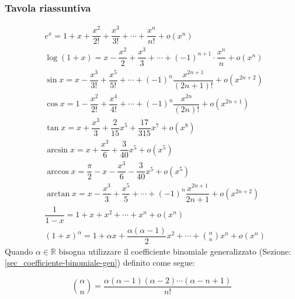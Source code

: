 
\clearpage %
\subsubsection{Tavola riassuntiva}
\begin{align*}
	&e^x = 1 + x + \dfrac{x^2}{2!} + \dfrac{x^3}{3!} + \cdots + \dfrac{x^n}{n!} + o(x^n)\\[10pt]
	&\log(1 + x) = x - \dfrac{x^2}{2} + \dfrac{x^3}{3} + \cdots + (-1)^{n+1} \cdot \dfrac{x^n}{n} + o(x^n)\\[10pt]
	&\sin{x} = x - \dfrac{x^3}{3!} + \dfrac{x^5}{5!} + \cdots + (-1)^n \dfrac{x^{2n+1}}{(2n+1)!} + o(x^{2n+2})\\[10pt]
	&\cos{x} = 1 - \dfrac{x^2}{2!} + \dfrac{x^4}{4!} + \cdots + (-1)^n \dfrac{x^{2n}}{(2n)!} + o(x^{2n+1})\\[10pt]
	&\tan{x} = x + \dfrac{x^3}{3} + \dfrac{2}{15}x^5 + \dfrac{17}{315}x^7 + o(x^8)\\[10pt]
	&\arcsin{x} = x + \dfrac{x^3}{6} + \dfrac{3}{40}x^5 + o(x^5)\\[10pt]
	&\arccos{x} = \dfrac{\pi}{2} - x - \dfrac{x^3}{6} - \dfrac{3}{40} x^5 + o(x^5)\\[10pt]
	&\arctan{x} = x - \dfrac{x^3}{3} + \dfrac{x^5}{5} + \cdots + (-1)^n \dfrac{x^{2n+1}}{2n+1} + o(x^{2n+2})\\[10pt]
	&\dfrac{1}{1 - x} = 1 + x + x^2 + \cdots + x^n + o(x^n)\\[10pt]
	&(1 + x)^\alpha = 1 + \alpha x + \dfrac{\alpha(\alpha - 1)}{2} x^2 + \cdots +  \binom{\alpha}{n} x^n + o(x^n)
\end{align*}
Quando $\alpha \in \mathbb{R}$ bisogna utilizzare il coefficiente binomiale generalizzato (Sezione: \ref{sec_coefficiente-binomiale-gen}) definito come segue:

\begin{equation*}
	\binom{\alpha}{n} = \dfrac{\alpha (\alpha - 1) (\alpha -2) \cdots (\alpha - n + 1)}{n!}
\end{equation*}